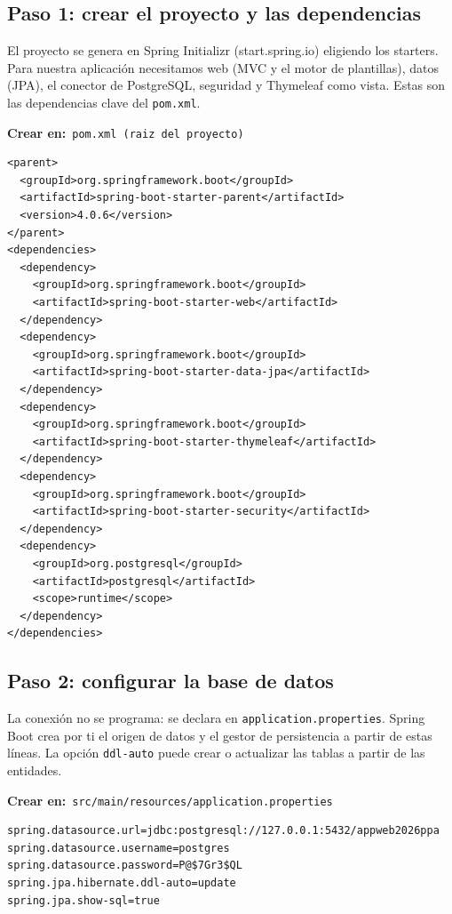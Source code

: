\documentclass[11pt]{article}
\begin{document}
\subsection{Paso 1: crear el proyecto y las dependencias}
El proyecto se genera en Spring Initializr (start.spring.io) eligiendo los starters. Para nuestra aplicación necesitamos web (MVC y el motor de plantillas), datos (JPA), el conector de PostgreSQL, seguridad y Thymeleaf como vista. Estas son las dependencias clave del \texttt{pom.\allowbreak{}xml}.

{\small\color{jwebazulo}\textbf{Crear en:}~}\texttt{pom.\allowbreak{}xml  (raiz del proyecto)}\par\nobreak\vspace{-1pt}
\begin{cajacodigo}
\begin{lstlisting}[style=xml]
<parent>
  <groupId>org.springframework.boot</groupId>
  <artifactId>spring-boot-starter-parent</artifactId>
  <version>4.0.6</version>
</parent>
<dependencies>
  <dependency>
    <groupId>org.springframework.boot</groupId>
    <artifactId>spring-boot-starter-web</artifactId>
  </dependency>
  <dependency>
    <groupId>org.springframework.boot</groupId>
    <artifactId>spring-boot-starter-data-jpa</artifactId>
  </dependency>
  <dependency>
    <groupId>org.springframework.boot</groupId>
    <artifactId>spring-boot-starter-thymeleaf</artifactId>
  </dependency>
  <dependency>
    <groupId>org.springframework.boot</groupId>
    <artifactId>spring-boot-starter-security</artifactId>
  </dependency>
  <dependency>
    <groupId>org.postgresql</groupId>
    <artifactId>postgresql</artifactId>
    <scope>runtime</scope>
  </dependency>
</dependencies>
\end{lstlisting}
\end{cajacodigo}
\vspace{2pt}
\subsection{Paso 2: configurar la base de datos}
La conexión no se programa: se declara en \texttt{application.\allowbreak{}properties}. Spring Boot crea por ti el origen de datos y el gestor de persistencia a partir de estas líneas. La opción \texttt{ddl-auto} puede crear o actualizar las tablas a partir de las entidades.

{\small\color{jwebazulo}\textbf{Crear en:}~}\texttt{src/\allowbreak{}main/\allowbreak{}resources/\allowbreak{}application.\allowbreak{}properties}\par\nobreak\vspace{-1pt}
\begin{cajacodigo}
\begin{lstlisting}[style=markup]
spring.datasource.url=jdbc:postgresql://127.0.0.1:5432/appweb2026ppa
spring.datasource.username=postgres
spring.datasource.password=P@$7Gr3$QL
spring.jpa.hibernate.ddl-auto=update
spring.jpa.show-sql=true
\end{lstlisting}
\end{cajacodigo}
\vspace{2pt}
\end{document}
